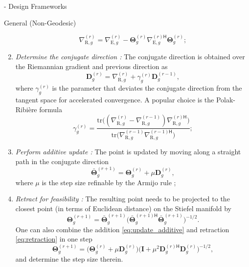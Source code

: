 \documentclass[journal]{IEEEtran}
\begin{document}
\begin{section}{- Design Frameworks}
\begin{subsection}{General (Non-Geodesic) }
\begin{enumerate}
\begin{equation}
				\nabla_{\mathrm{R},g}^{(r)} = \nabla_{\mathrm{E},g}^{(r)} - \mathbf{\Theta}_g^{(r)} {\nabla_{\mathrm{E},g}^{(r)\mathsf{H}}} \mathbf{\Theta}_g^{(r)};
				\label{eq:gradient_riemannian}
			\end{equation}
			\item \emph{Determine the conjugate direction \cite{Nocedal2006}:} The conjugate direction is obtained over the Riemannian gradient and previous direction as
			\begin{equation}
				\mathbf{D}_g^{(r)} = \nabla_{\mathrm{R},g}^{(r)} + \gamma_g^{(r)} \mathbf{D}_g^{(r-1)}, %
				\label{eq:direction_cg}
			\end{equation}
			where $\gamma_g^{(r)}$ is the parameter that deviates the conjugate direction from the tangent space for accelerated convergence. A popular choice is the Polak-Ribi\`{e}re formula
			\begin{equation}
				\gamma_g^{(r)} = \frac{\mathrm{tr}\bigl((\nabla_{\mathrm{R},g}^{(r)} - \nabla_{\mathrm{R},g}^{(r-1)}) {\nabla_{\mathrm{R},g}^{(r)\mathsf{H}}}\bigr)}{\mathrm{tr}\bigl(\nabla_{\mathrm{R},g}^{(r-1)} {\nabla_{\mathrm{R},g}^{(r-1)\mathsf{H}}}\bigr)}; %
				\label{eq:parameter_cg}
			\end{equation}
			\item \emph{Perform additive update \cite{Pan2022d}:} The point is updated by moving along a straight path in the conjugate direction
			\begin{equation}
				\bar{\mathbf{\Theta}}_g^{(r+1)} = \mathbf{\Theta}_g^{(r)} + \mu \mathbf{D}_g^{(r)},
				\label{eq:update_additive}
			\end{equation}
			where $\mu$ is the step size refinable by the Armijo rule \cite{Armijo1966};
			\item \emph{Retract for feasibility \cite{Absil2009,Li2023b}:} The resulting point needs to be projected to the closest point (in terms of Euclidean distance) on the Stiefel manifold by
			\begin{equation}
				\mathbf{\Theta}_g^{(r+1)} = \bar{\mathbf{\Theta}}_g^{(r+1)} \bigl({\bar{\mathbf{\Theta}}_g^{(r+1)\mathsf{H}}} \bar{\mathbf{\Theta}}_g^{(r+1)}\bigr)^{-1/2}.
				\label{eq:retraction}
			\end{equation}
			One can also combine the addition \eqref{eq:update_additive} and retraction \eqref{eq:retraction} in one step
			\begin{equation}
				\mathbf{\Theta}_g^{(r+1)} = \bigl(\mathbf{\Theta}_g^{(r)} + \mu \mathbf{D}_g^{(r)}\bigr) \bigl( \mathbf{I} + \mu^2 {\mathbf{D}_g^{(r)\mathsf{H}}} \mathbf{D}_g^{(r)} \bigr)^{-1/2},
				\label{eq:add_then_retract}
			\end{equation}
			and determine the step size therein.
		\end{enumerate}


\end{subsection}
\end{section}
\end{document}
